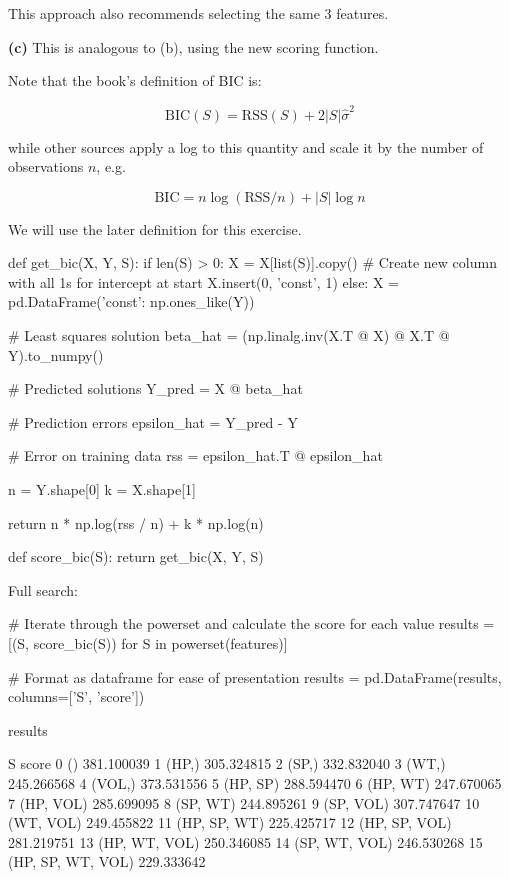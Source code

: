 This approach also recommends selecting the same 3 features.

\textbf{(c)} This is analogous to (b), using the new scoring function.

Note that the book's definition of BIC is:

\[ \text{BIC}(S) = \text{RSS}(S) + 2 |S| \hat{\sigma}^{2} \]

while other sources apply a log to this quantity and scale it by the
number of observations \(n\), e.g.

\[ \text{BIC} = n \log \left( \text{RSS} / n \right) + |S| \log n \]

We will use the later definition for this exercise.

\begin{python}
def get_bic(X, Y, S):
    if len(S) > 0:
        X = X[list(S)].copy()
        # Create new column with all 1s for intercept at start
        X.insert(0, 'const', 1)
    else:
        X = pd.DataFrame({'const': np.ones_like(Y)})
    
    # Least squares solution
    beta_hat = (np.linalg.inv(X.T @ X) @ X.T @ Y).to_{n}umpy()

    # Predicted solutions
    Y_pred = X @ beta_hat

    # Prediction errors
    epsilon_hat = Y_pred - Y

    # Error on training data
    rss = epsilon_hat.T @ epsilon_hat
    
    n = Y.shape[0]
    k = X.shape[1]
    
    return n * np.log(rss / n) + k * np.log(n)

def score_bic(S):
    return get_bic(X, Y, S)
\end{python}

Full search:

\begin{python}
# Iterate through the powerset and calculate the score for each value
results = [(S, score_bic(S)) for S in powerset(features)]
    
# Format as dataframe for ease of presentation
results = pd.DataFrame(results, columns=['S', 'score'])
\end{python}

\begin{python}
results
\end{python}

\begin{console}
                    S       score
0                  ()  381.100039
1               (HP,)  305.324815
2               (SP,)  332.832040
3               (WT,)  245.266568
4              (VOL,)  373.531556
5            (HP, SP)  288.594470
6            (HP, WT)  247.670065
7           (HP, VOL)  285.699095
8            (SP, WT)  244.895261
9           (SP, VOL)  307.747647
10          (WT, VOL)  249.455822
11       (HP, SP, WT)  225.425717
12      (HP, SP, VOL)  281.219751
13      (HP, WT, VOL)  250.346085
14      (SP, WT, VOL)  246.530268
15  (HP, SP, WT, VOL)  229.333642
\end{console}

